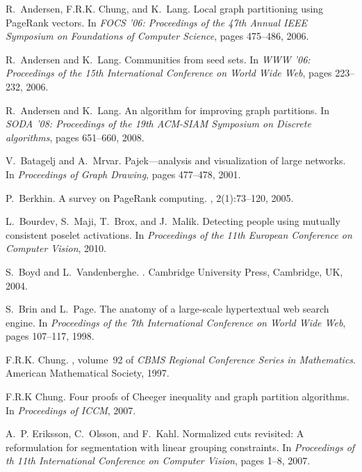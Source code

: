 \documentclass[11pt]{article}
\begin{document}
\begin{thebibliography}{10}

R.~Andersen, F.R.K. Chung, and K.~Lang.
\newblock Local graph partitioning using {PageRank} vectors.
\newblock In {\em FOCS '06: Proceedings of the 47th Annual IEEE Symposium on
  Foundations of Computer Science}, pages 475--486, 2006.

R.~Andersen and K.~Lang.
\newblock Communities from seed sets.
\newblock In {\em WWW '06: Proceedings of the 15th International Conference on
  World Wide Web}, pages 223--232, 2006.

R.~Andersen and K.~Lang.
\newblock An algorithm for improving graph partitions.
\newblock In {\em SODA '08: Proceedings of the 19th ACM-SIAM Symposium on
  Discrete algorithms}, pages 651--660, 2008.

V.~Batagelj and A.~Mrvar.
\newblock Pajek---analysis and visualization of large networks.
\newblock In {\em Proceedings of Graph Drawing}, pages 477--478, 2001.

P.~Berkhin.
\newblock A survey on {PageRank} computing.
, 2(1):73--120, 2005.

L.~Bourdev, S.~Maji, T.~Brox, and J.~Malik.
\newblock Detecting people using mutually consistent poselet activations.
\newblock In {\em Proceedings of the 11th European Conference on Computer
  Vision}, 2010.

S.~Boyd and L.~Vandenberghe.
.
\newblock Cambridge University Press, Cambridge, UK, 2004.

S.~Brin and L.~Page.
\newblock The anatomy of a large-scale hypertextual web search engine.
\newblock In {\em Proceedings of the 7th International Conference on World Wide
  Web}, pages 107--117, 1998.

F.R.K. Chung.
, volume~92 of {\em CBMS Regional
  Conference Series in Mathematics}.
\newblock American Mathematical Society, 1997.

F.R.K Chung.
\newblock Four proofs of {C}heeger inequality and graph partition algorithms.
\newblock In {\em Proceedings of ICCM}, 2007.

A.~P. Eriksson, C.~Olsson, and F.~Kahl.
\newblock Normalized cuts revisited: A reformulation for segmentation with
  linear grouping constraints.
\newblock In {\em Proceedings of th 11th International Conference on Computer
  Vision}, pages 1--8, 2007.


\end{thebibliography}
\end{document}
